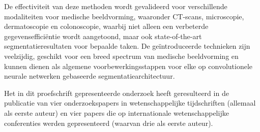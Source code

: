 De effectiviteit van deze methoden wordt gevalideerd voor verschillende modaliteiten voor medische beeldvorming, waaronder CT-scans, microscopie, dermatoscopie en colonoscopie, waarbij niet alleen een verbeterde gegevensefficiëntie wordt aangetoond, maar ook state-of-the-art segmentatieresultaten voor bepaalde taken. De geïntroduceerde technieken zijn veelzijdig, geschikt voor een breed spectrum van medische beeldvorming en kunnen dienen als algemene voorbewerkingsstappen voor elke op convolutionele neurale netwerken gebaseerde segmentatiearchitectuur.

Het in dit proefschrift gepresenteerde onderzoek heeft geresulteerd in de publicatie van vier onderzoekspapers in wetenschappelijke tijdschriften (allemaal als eerste auteur) en vier papers die op internationale wetenschappelijke conferenties werden gepresenteerd (waarvan drie als eerste auteur). 